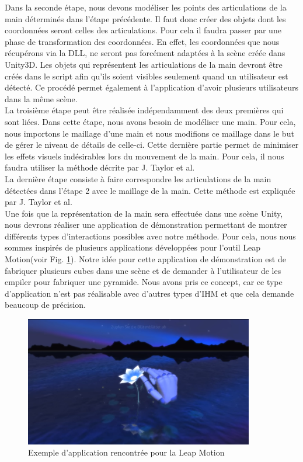 Dans la seconde étape, nous devons modéliser les points des articulations de la main déterminés 
dans l'étape précédente. Il faut donc créer des objets dont les coordonnées seront celles des articulations.
Pour cela il faudra passer par une phase de transformation des coordonnées. En effet, les coordonnées
que nous récupérons via la DLL, ne seront pas forcément adaptées à la scène créée dans Unity3D. Les 
objets qui représentent les articulations de la main devront être créés dans le script afin qu'ils 
soient visibles seulement quand un utilisateur est détecté. Ce procédé permet également à l'application
d'avoir plusieurs utilisateurs dans la même scène.\\

La troisième étape peut être réalisée indépendamment des deux premières qui sont liées. Dans cette étape,
nous avons besoin de modéliser une main. Pour cela, nous importons le maillage d'une main et
nous modifions ce maillage dans le but de gérer le niveau de détails de celle-ci. Cette dernière
partie permet de minimiser les effets visuels indésirables lors du mouvement de la main.
Pour cela, il nous faudra utiliser la méthode décrite par J. Taylor et al\cite{export:217428}.\\

La dernière étape consiste à faire correspondre les articulations de la main détectées dans l'étape 2 avec
le maillage de la main. Cette méthode est expliquée par J. Taylor et al\cite{export:217428}.\\

Une fois que la représentation de la main sera effectuée dans une scène Unity, nous devrons réaliser une 
application de démonstration permettant de montrer différents types d'interactions possibles avec notre 
méthode. Pour cela, nous nous sommes inspirés de plusieurs applications développées pour l'outil
Leap Motion(voir Fig. \ref{fig:example}). Notre idée pour cette application de démonstration est de fabriquer plusieurs cubes dans 
une scène et de demander à l'utilisateur de les empiler pour fabriquer une pyramide. Nous avons pris
ce concept, car ce type d'application n'est pas réalisable avec d'autres types d'IHM et que cela demande
beaucoup de précision.

\begin{figure}
  \begin{center}
    \includegraphics[width=10cm]{images/exampleHand.png}
    \caption{Exemple d'application rencontrée pour la Leap Motion}
    \label{fig:example}
  \end{center}
\end{figure}

